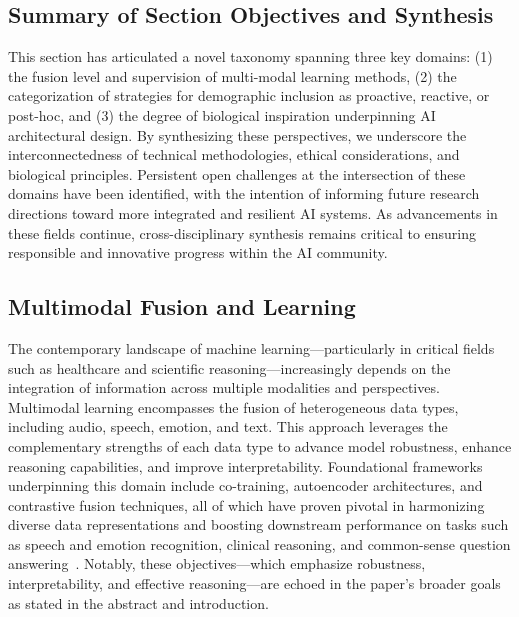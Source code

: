 \documentclass[sigconf]{acmart}
\begin{document}
\subsection*{Summary of Section Objectives and Synthesis}

This section has articulated a novel taxonomy spanning three key domains: (1) the fusion level and supervision of multi-modal learning methods, (2) the categorization of strategies for demographic inclusion as proactive, reactive, or post-hoc, and (3) the degree of biological inspiration underpinning AI architectural design. By synthesizing these perspectives, we underscore the interconnectedness of technical methodologies, ethical considerations, and biological principles. Persistent open challenges at the intersection of these domains have been identified, with the intention of informing future research directions toward more integrated and resilient AI systems. As advancements in these fields continue, cross-disciplinary synthesis remains critical to ensuring responsible and innovative progress within the AI community.

\subsection{Multimodal Fusion and Learning}

The contemporary landscape of machine learning—particularly in critical fields such as healthcare and scientific reasoning—increasingly depends on the integration of information across multiple modalities and perspectives. Multimodal learning encompasses the fusion of heterogeneous data types, including audio, speech, emotion, and text. This approach leverages the complementary strengths of each data type to advance model robustness, enhance reasoning capabilities, and improve interpretability. Foundational frameworks underpinning this domain include co-training, autoencoder architectures, and contrastive fusion techniques, all of which have proven pivotal in harmonizing diverse data representations and boosting downstream performance on tasks such as speech and emotion recognition, clinical reasoning, and common-sense question answering~\cite{ref79,ref31,ref36,ref46,ref47,ref48,ref49,ref50,ref55,ref60,ref74,ref75,ref80,ref87,ref88,ref89,ref90}. Notably, these objectives—which emphasize robustness, interpretability, and effective reasoning—are echoed in the paper’s broader goals as stated in the abstract and introduction.
\end{document}
